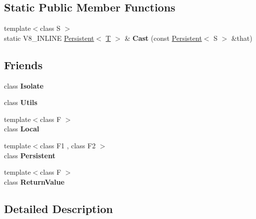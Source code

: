 \subsection*{Static Public Member Functions}
\begin{DoxyCompactItemize}
\item 
\mbox{\label{classv8_1_1Persistent_aefcf5962630a14c198f466f64a685946}} 
{\footnotesize template$<$class S $>$ }\\static V8\+\_\+\+I\+N\+L\+I\+NE \mbox{\hyperlink{classv8_1_1Persistent}{Persistent}}$<$ \mbox{\hyperlink{classv8_1_1internal_1_1torque_1_1T}{T}} $>$ \& {\bfseries Cast} (const \mbox{\hyperlink{classv8_1_1Persistent}{Persistent}}$<$ S $>$ \&that)
\end{DoxyCompactItemize}
\subsection*{Friends}
\begin{DoxyCompactItemize}
\item 
\mbox{\label{classv8_1_1Persistent_aba4f0964bdacf2bbf62cf876e5d28d0a}} 
class {\bfseries Isolate}
\item 
\mbox{\label{classv8_1_1Persistent_abc0f7da619e9e72510dc07ed7b5ff6d8}} 
class {\bfseries Utils}
\item 
\mbox{\label{classv8_1_1Persistent_afb872edb4aac7ba55f0da004113aa2b0}} 
{\footnotesize template$<$class F $>$ }\\class {\bfseries Local}
\item 
\mbox{\label{classv8_1_1Persistent_ad845ec8872174be0a9ca9a3dd1898d30}} 
{\footnotesize template$<$class F1 , class F2 $>$ }\\class {\bfseries Persistent}
\item 
\mbox{\label{classv8_1_1Persistent_a53f604d3d6f2dc0647df33c9979f116a}} 
{\footnotesize template$<$class F $>$ }\\class {\bfseries Return\+Value}
\end{DoxyCompactItemize}


\subsection{Detailed Description}
